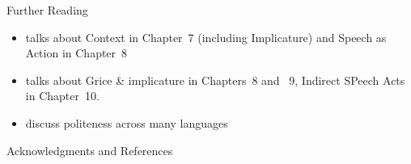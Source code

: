 \documentclass{beamer}
\begin{document}

\begin{frame}{Further Reading}

\begin{itemize}
\item  \citet{Saeed:2015} talks about Context in Chapter~7 (including Implicature) and  Speech as Action in Chapter~8
\item  \citet{Kroeger:2022} talks about Grice \& implicature in Chapters~8 and ~9, Indirect SPeech Acts in  Chapter~10.
\item \citet{Brown:Levinson:1987} discuss politeness across many languages
\end{itemize}
\end{frame}



\begin{frame}[allowframebreaks]{Acknowledgments and References}

\small



\end{frame}
\end{document}
